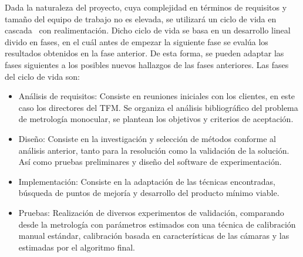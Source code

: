 Dada la naturaleza del proyecto, cuya complejidad en términos de requisitos y tamaño 
del equipo de trabajo no es elevada, se utilizará un ciclo de vida en cascada~\cite{ModeloEnCascada} con realimentación.
Dicho ciclo de vida se basa en un desarrollo lineal divido en fases, en el cuál antes 
de empezar la siguiente fase se evalúa los resultados obtenidos en la fase anterior. 
De esta forma, se pueden adaptar las fases siguientes a los posibles 
nuevos hallazgos de las fases anteriores.
Las fases del ciclo de vida son: 
\begin{itemize}
  \item Análisis de requisitos: Consiste en reuniones iniciales con los clientes, 
    en este caso los directores del TFM. Se organiza el análisis bibliográfico 
    del problema de metrología monocular, se plantean los objetivos y criterios de aceptación.
  \item Diseño: Consiste en la investigación y selección de métodos conforme 
    al análisis anterior, tanto para la resolución como la validación de la solución. 
    Así como pruebas preliminares y diseño del software de experimentación. 
  \item Implementación: Consiste en la adaptación de las técnicas encontradas, 
      búsqueda de puntos de mejoría y desarrollo del producto mínimo viable. 
  \item Pruebas: Realización de diversos experimentos de validación, 
      comparando desde la metrología con parámetros estimados con una técnica de calibración manual estándar, 
      calibración basada en características de las cámaras y las estimadas por el algoritmo final.
\end{itemize}
